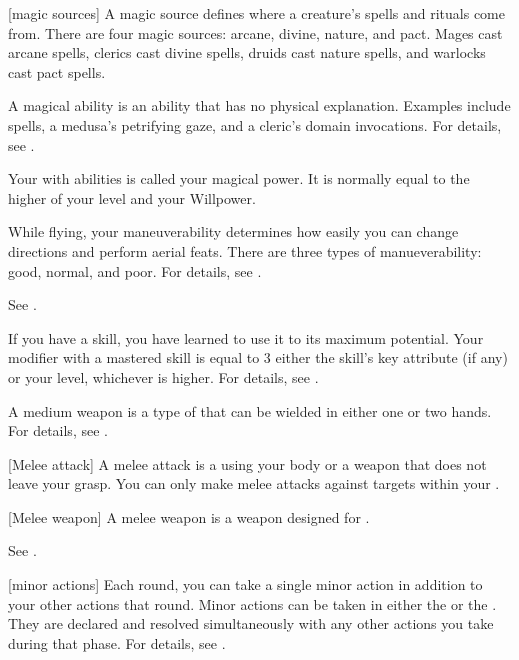 [magic sources] A magic source defines where a creature's spells and rituals come from.
There are four magic sources: arcane, divine, nature, and pact.
Mages cast arcane spells, clerics cast divine spells, druids cast nature spells, and warlocks cast pact spells.

 A magical ability is an ability that has no physical explanation.
Examples include spells, a medusa's petrifying gaze, and a cleric's domain invocations.
For details, see .

 Your  with  abilities is called your magical power.
It is normally equal to the higher of your level and your Willpower.

 While flying, your maneuverability determines how easily you can change directions and perform aerial feats.
There are three types of manueverability: good, normal, and poor.
For details, see .

 See .

 If you have  a skill, you have learned to use it to its maximum potential.
Your modifier with a mastered skill is equal to 3 \add either the skill's key attribute (if any) or your level, whichever is higher.
For details, see .

 A medium weapon is a type of  that can be wielded in either one or two hands.
For details, see .

[Melee attack] A melee attack is a  using your body or a weapon that does not leave your grasp.
You can only make melee attacks against targets within your .

[Melee weapon] A melee weapon is a weapon designed for .

 See .

[minor actions] Each round, you can take a single minor action in addition to your other actions that round.
Minor actions can be taken in either the  or the .
They are declared and resolved simultaneously with any other actions you take during that phase.
For details, see .


